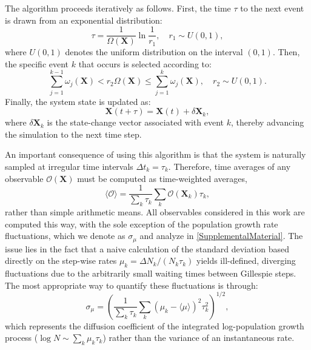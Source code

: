 \documentclass[aps,pre,reprint,10pt,superscriptaddress]{revtex4-2}
\begin{document}
\begin{appendices}
    The algorithm proceeds iteratively as follows. First, the time $\tau$ to the next event is drawn from an exponential distribution:
    \begin{equation}
        \tau=\frac{1}{\Omega(\mathbf{X})}\ln\frac{1}{r_1},\quad r_1\sim U(0,1),
    \end{equation}
    where $U(0,1)$ denotes the uniform distribution on the interval $(0,1)$. Then, the specific event $k$ that occurs is selected according to:
    \begin{equation}
        \sum_{j=1}^{k-1}\omega_j(\mathbf{X})<r_2\Omega(\mathbf{X})\le\sum_{j=1}^{k}\omega_j(\mathbf{X}),\quad r_2\sim U(0,1).
    \end{equation}
    Finally, the system state is updated as:
    \begin{equation}
        \mathbf{X}(t+\tau)=\mathbf{X}(t)+\delta\mathbf{X}_k,
    \end{equation}
    where $\delta\mathbf{X}_k$ is the state-change vector associated with event $k$, thereby advancing the simulation to the next time step.

    An important consequence of using this algorithm is that the system is naturally sampled at irregular time intervals $\Delta t_k=\tau_k$. Therefore, time averages of any observable $\mathcal{O}(\mathbf{X})$ must be computed as time-weighted averages,
    \begin{equation}
        \langle\mathcal{O}\rangle=\frac{1}{\sum_k\tau_k}\sum_k\mathcal{O}(\mathbf{X}_k)\tau_k,
    \end{equation}
    rather than simple arithmetic means. All observables considered in this work are computed this way, with the sole exception of the population growth rate fluctuations, which we denote as $\sigma_\mu$ and analyze in \cref{SupplementalMaterial}. The issue lies in the fact that a naive calculation of the standard deviation based directly on the step-wise rates $\mu_k=\Delta N_k/(N_k\tau_k)$ yields ill-defined, diverging fluctuations due to the arbitrarily small waiting times between Gillespie steps. The most appropriate way to quantify these fluctuations is through:
    \begin{equation} \label{eq:std_dev_growth_rate}
        \sigma_\mu=\left(\frac{1}{\sum_k\tau_k}\sum_k\left(\mu_k-\langle\mu\rangle\right)^2\tau_k^2\right)^{1/2},
    \end{equation}
    which represents the diffusion coefficient of the integrated log-population growth process ($\log N\sim\sum_k\mu_k\tau_k$) rather than the variance of an instantaneous rate.

\end{appendices}

\newpage


\end{document}
